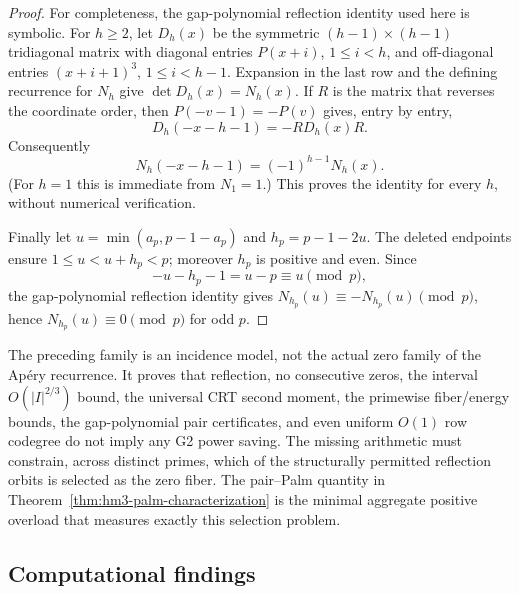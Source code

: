\begin{proof}
For completeness, the gap-polynomial reflection identity used here is
symbolic.  For $h\ge2$, let $D_h(x)$ be the symmetric
$(h-1)\times(h-1)$ tridiagonal matrix with diagonal entries
$P(x+i)$, $1\le i<h$, and off-diagonal entries
$(x+i+1)^3$, $1\le i<h-1$.  Expansion in the last row and the defining
recurrence for $N_h$ give $\det D_h(x)=N_h(x)$.  If $R$ is the matrix
that reverses the coordinate order, then $P(-v-1)=-P(v)$ gives, entry by
entry,
\[
  D_h(-x-h-1)=-R D_h(x)R.
\]
Consequently
\begin{equation}
  N_h(-x-h-1)=(-1)^{h-1}N_h(x).                       \label{eq:hm3-gap-reflection}
\end{equation}
(For $h=1$ this is immediate from $N_1=1$.)  This proves the identity
for every $h$, without numerical verification.

Finally let $u=\min(a_p,p-1-a_p)$ and $h_p=p-1-2u$.
The deleted endpoints ensure $1\le u<u+h_p<p$; moreover $h_p$ is positive
and even.  Since
\[
  -u-h_p-1=u-p\equiv u\pmod p,
\]
the gap-polynomial reflection identity gives
$N_{h_p}(u)\equiv-N_{h_p}(u)\pmod p$, hence
$N_{h_p}(u)\equiv0\pmod p$ for odd $p$.
\end{proof}

\begin{remark}
The preceding family is an incidence model, not the actual zero family of
the Ap\'ery recurrence.  It proves that reflection, no consecutive zeros,
the interval $O(|I|^{2/3})$ bound, the universal CRT second moment, the
primewise fiber/energy bounds, the gap-polynomial pair certificates, and
even uniform $O(1)$ row codegree do not imply any G2 power saving.  The
missing arithmetic must constrain, across distinct primes, which of the
structurally permitted reflection orbits is selected as the zero fiber.
The pair--Palm quantity in Theorem~\ref{thm:hm3-palm-characterization}
is the minimal aggregate positive overload that measures exactly this
selection problem.
\end{remark}

\subsection*{Computational findings}

